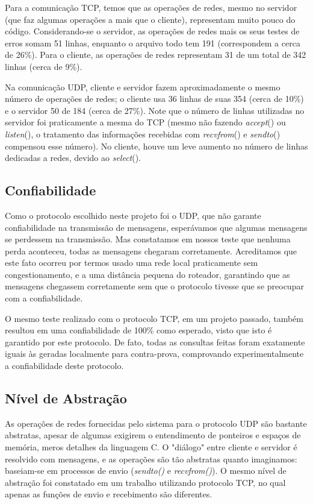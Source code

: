 \documentclass[12pt,a4paper]{article}
\begin{document}
Para a comunicação TCP, temos que as operações de redes, mesmo no servidor (que faz algumas operações a mais que o cliente), representam muito pouco do código. Considerando-se o servidor, as operações de redes mais os seus testes de erros somam 51 linhas, enquanto o arquivo todo tem 191 (correspondem a cerca de 26\%). Para o cliente, as operações de redes representam 31 de um total de 342 linhas (cerca de 9\%).

Na comunicação UDP, cliente e servidor fazem aproximadamente o mesmo número de operações de redes; o cliente usa 36 linhas de suas 354 (cerca de 10\%) e o servidor 50 de 184 (cerca de 27\%). Note que o número de linhas utilizadas no servidor foi praticamente a mesma do TCP (mesmo não fazendo {\it accept}() ou {\it listen}(), o tratamento das informações recebidas com {\it recvfrom}() e {\it sendto}() compensou esse número). No cliente, houve um leve aumento no número de linhas dedicadas a redes, devido ao {\it select}().

\subsection{Confiabilidade}

Como o protocolo escolhido neste projeto foi o UDP, que não garante confiabilidade na transmissão de mensagens, esperávamos que algumas mensagens se perdessem na transmissão. Mas constatamos em nossos teste que nenhuma perda aconteceu, todas as mensagens chegaram corretamente. Acreditamos que este fato ocorreu por termos usado uma rede local praticamente sem congestionamento, e a uma distância pequena do roteador, garantindo que as mensagens chegassem corretamente sem que o protocolo tivesse que se preocupar com a confiabilidade.

O mesmo teste realizado com o protocolo TCP, em um projeto passado, também resultou em uma confiabilidade de 100\% como esperado, visto que isto é garantido por este protocolo. De fato, todas as consultas feitas foram exatamente iguais às geradas localmente para contra-prova, comprovando experimentalmente a confiabilidade deste protocolo.

\subsection{Nível de Abstração}

As operações de redes fornecidas pelo sistema para o protocolo UDP são bastante abstratas, apesar de algumas exigirem o entendimento de ponteiros e espaços de memória, meros detalhes da linguagem C. O "diálogo" entre cliente e servidor é resolvido com mensagens, e as operações são tão abstratas quanto imaginamos: baseiam-se em processos de envio ({\it sendto()} e {\it recvfrom()}). O mesmo nível de abstração foi constatado em um trabalho utilizando protocolo TCP, no qual apenas as funções de envio e recebimento são diferentes.
\end{document}

